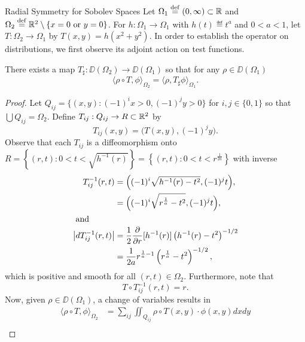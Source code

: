\begin{chapter}{Radial Symmetry for Sobolev Spaces}
Let $\Omega_1 \stackrel{\rm def}{=} (0,\infty) \subset \mathbb R$ and $\Omega_2 \stackrel{\rm def}{=} \mathbb R^2 \setminus \{x = 0\text{ or }y=0\}$.
For $h:\Omega_1\to\Omega_1$ with $h(t) \eqdef t^a$ and $0<a<1$, let $T:\Omega_2 \to \Omega_1$ by $T(x,y) = h(x^2 + y^2)$.
In order to establish the operator on distributions, we first observe its adjoint action on test functions.
\begin{lem} \label{lem:existence}
  There exists a map $T_{\sharp}:\DD(\Omega_2) \to \DD(\Omega_1)$ so that for any $\rho \in \DD(\Omega_1)$
  \begin{equation}
    \langle \rho \circ T, \phi \rangle_{\Omega_2} = \langle \rho, T_\sharp \phi\rangle_{\Omega_1}.
  \end{equation}
\end{lem}
\begin{proof}
  Let $Q_{ij} = \{ (x,y): (-1)^i x>0, (-1)^jy>0\}$ for $i,j \in \{0,1\}$ so that $\bigcup Q_{ij} = \Omega_2$.
  Define $T_{ij}:Q_{ij} \to R\subset \mathbb R^2$ by 
  \begin{equation}
    T_{ij}(x,y) = \Big(T(x,y), (-1)^jy\Big). 
  \end{equation}
  Observe that each $T_{ij}$ is a diffeomorphism onto $R = \left\{(r,t): 0 < t < \sqrt{h^{-1}(r)}\right\} = \left\{(r,t): 0 < t < r^{\frac{1}{2a}}\right\}$ with inverse 
  \begin{align}
    T_{ij}^{-1}(r,t) 
      &= \Big((-1)^i\sqrt{h^{-1}(r) - t^2}, (-1)^jt\Big),\nonumber\\
      &= \Big((-1)^i\sqrt{r^{\frac 1a} - t^2}, (-1)^jt\Big),\\
    \intertext{ and }
    \left|dT_{ij}^{-1}(r,t)\right| 
      &= \frac12 \frac{\partial}{\partial r}[h^{-1}(r)]\left(h^{-1}(r) - t^2\right)^{-1/2}\nonumber \\
      &= \frac{1}{2a} r^{\frac 1a-1}\left(r^{\frac 1a} - t^2\right)^{-1/2}, \label{eq:determinant}
  \end{align}
  which is positive and smooth for all $(r,t)\in \Omega_2$.
  Furthermore, note that 
  \begin{equation}
    T \circ T_{ij}^{-1}(r,t) = r. \label{eq:partialInverseT}
  \end{equation}
  Now, given $\rho \in \DD(\Omega_1)$, a change of variables results in
  \begin{align}
    \langle \rho \circ T, \phi\rangle_{\Omega_2} 
    &= \sum_{ij}\iint_{Q_{ij}} \rho\circ T(x,y)\cdot \phi(x,y)dxdy \nonumber \\

\end{align}
\end{proof}
\end{chapter}

